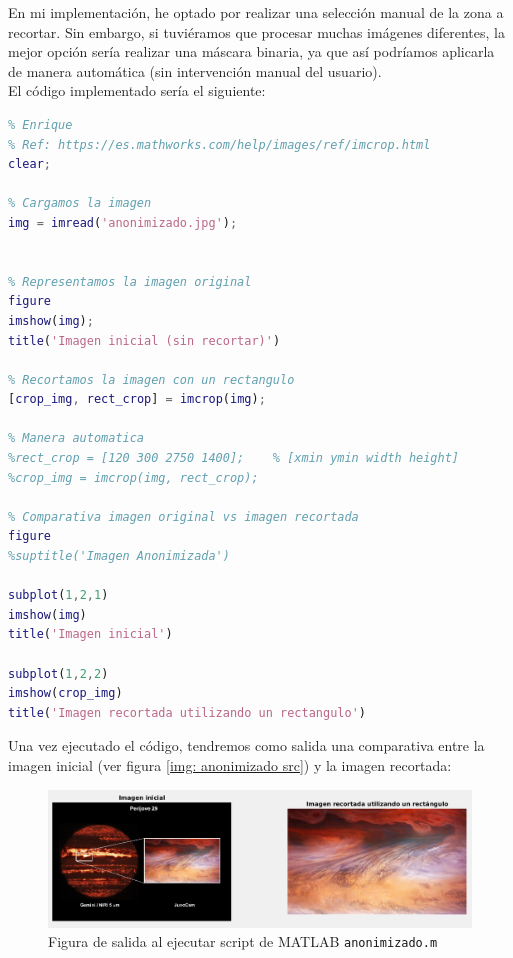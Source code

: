 \documentclass[12pt]{article}
\begin{document}
	\noindent En mi implementación, he optado por realizar una selección manual de la zona a recortar. Sin embargo, si tuviéramos que procesar muchas imágenes diferentes, la mejor opción sería realizar una máscara binaria, ya que así podríamos aplicarla de manera automática (sin intervención manual del usuario). \\
	
	\noindent El código implementado sería el siguiente:
	
	\begin{lstlisting}[language=Matlab, caption={Implementación anonimizado con MATLAB}]
% 1 - Anonimizado
% Enrique 
% Ref: https://es.mathworks.com/help/images/ref/imcrop.html
clear;

% Cargamos la imagen
img = imread('anonimizado.jpg');


% Representamos la imagen original
figure
imshow(img);
title('Imagen inicial (sin recortar)')

% Recortamos la imagen con un rectangulo
[crop_img, rect_crop] = imcrop(img);

% Manera automatica
%rect_crop = [120 300 2750 1400];    % [xmin ymin width height]
%crop_img = imcrop(img, rect_crop);

% Comparativa imagen original vs imagen recortada
figure
%suptitle('Imagen Anonimizada')

subplot(1,2,1)
imshow(img)
title('Imagen inicial')

subplot(1,2,2)
imshow(crop_img)
title('Imagen recortada utilizando un rectangulo')
	\end{lstlisting}

	\vspace{10px}

	\noindent Una vez ejecutado el código, tendremos como salida una comparativa entre la imagen inicial (ver figura \ref{img: anonimizado src}) y la imagen recortada:
	
	\begin{figure}[h]
		\begin{center}
			\includegraphics[width=1\textwidth]{img/anonimizado_output.png}
			\caption{Figura de salida al ejecutar script de MATLAB \texttt{anonimizado.m}}
			\label{img: anonimizado output}
		\end{center}
	\end{figure}
	
\end{document}

